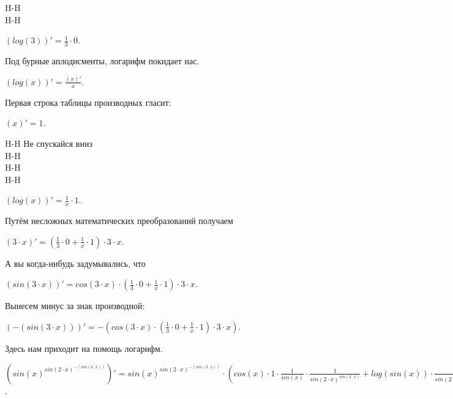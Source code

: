 \documentclass{article}
\begin{document}
H-H\\
H-H\\
\begin{center}$(log({3}))'=  \frac {1} {{{3}}} \cdot {0}$.\end{center}
Под бурные аплодисменты, логарифм покидает нас.\\
\begin{center}$(log(x))'= \frac { (x)'} {x}$.\end{center}
Первая строка таблицы производных гласит:\\
\begin{center}$(x)' = 1$.\end{center}
H-H Не спускайся вниз\\
H-H\\
H-H\\
H-H\\
\begin{center}$(log(x))'=  \frac {1} {{x}} \cdot {1}$.\end{center}
Путём несложных математических преобразований получаем\\
\begin{center}$({3} \cdot x)'= ( \frac {1} {{{3}}} \cdot {0}+ \frac {1} {{x}} \cdot {1}) \cdot {3} \cdot x$.\end{center}
А вы когда-нибудь задумывались, что\\
\begin{center}$(sin({3} \cdot x))'= cos({3} \cdot x) \cdot ( \frac {1} {{{3}}} \cdot {0}+ \frac {1} {{x}} \cdot {1}) \cdot {3} \cdot x$.\end{center}
Вынесем минус за знак производной:\\
\begin{center}$(-(sin({3} \cdot x)))'= -(cos({3} \cdot x) \cdot ( \frac {1} {{{3}}} \cdot {0}+ \frac {1} {{x}} \cdot {1}) \cdot {3} \cdot x)$.\end{center}
Здесь нам приходит на помощь логарифм.\\
\begin{center}$({sin(x)^{sin({2} \cdot x)^{-(sin({3} \cdot x))}}})'= {sin(x)^{sin({2} \cdot x)^{-(sin({3} \cdot x))}}} \cdot (cos(x) \cdot {1} \cdot  \frac {1} {{sin(x)}} \cdot  \frac {1} {{sin({2} \cdot x)} ^ {sin({3} \cdot x)}}+log(sin(x)) \cdot  \frac {1} {{sin({2} \cdot x)} ^ {sin({3} \cdot x)}} \cdot (cos({2} \cdot x) \cdot ( \frac {1} {{{2}}} \cdot {0}+ \frac {1} {{x}} \cdot {1}) \cdot {2} \cdot x \cdot  \frac {1} {{sin({2} \cdot x)}} \cdot {-(sin({3} \cdot x))}+log(sin({2} \cdot x)) \cdot -(cos({3} \cdot x) \cdot ( \frac {1} {{{3}}} \cdot {0}+ \frac {1} {{x}} \cdot {1}) \cdot {3} \cdot x)))$.\end{center}
\end{document}
